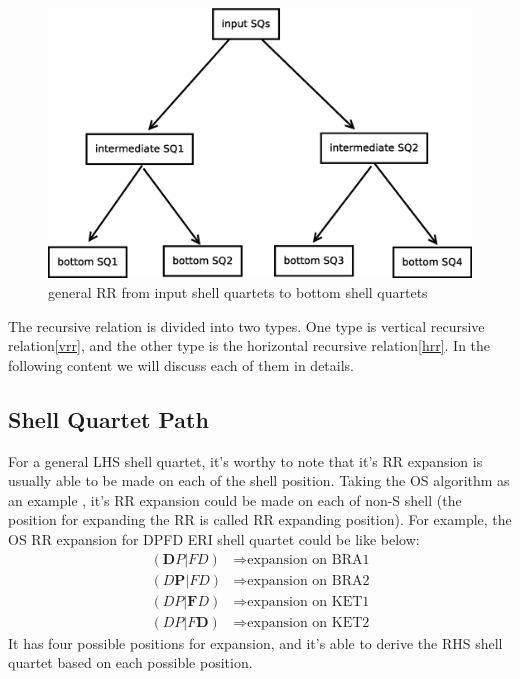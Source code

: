  \begin{figure}[htb]
 \centering
 \includegraphics[scale=0.5]{./general_rr.eps}
 \caption{general RR from input shell quartets to bottom shell quartets}
 \label{fig:1}
\end{figure}

The recursive relation is divided into two types. One type is 
vertical recursive relation\ref{vrr}, and the other type is the horizontal
recursive relation\ref{hrr}. In the following content we will discuss each
of them in details.

\subsection{Shell Quartet Path}
%
%
%
\label{rr_sq_path}

For a general LHS shell quartet, it's worthy to note that 
it's RR expansion is usually able to be made on each of 
the shell position. Taking the OS algorithm as an example
\cite{OS1986}, it's RR expansion could be made on each of non-S
shell (the position for expanding the RR is called RR expanding 
position). For example, the OS RR expansion for DPFD ERI shell quartet
could be like below:
\begin{align}
 (\bm{D}P|FD) &\Rightarrow \text{expansion on BRA1} \nonumber \\
 (D\bm{P}|FD) &\Rightarrow \text{expansion on BRA2} \nonumber \\
 (DP|\bm{F}D) &\Rightarrow \text{expansion on KET1} \nonumber \\
 (DP|F\bm{D}) &\Rightarrow \text{expansion on KET2}
\end{align}
It has four possible positions for expansion, and it's able to 
derive the RHS shell quartet based on each possible position.

